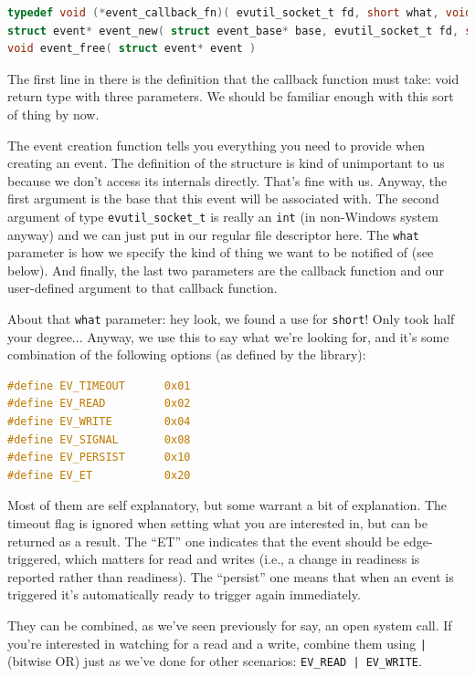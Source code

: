 \documentclass[a4paper]{report}
\begin{document}
\begin{lstlisting}[language=C]
typedef void (*event_callback_fn)( evutil_socket_t fd, short what, void* arg )
struct event* event_new( struct event_base* base, evutil_socket_t fd, short what, event_callback_fn cb, void* arg )
void event_free( struct event* event )
\end{lstlisting}

The first line in there is the definition that the callback function must take: void return type with three parameters. We should be familiar enough with this sort of thing by now.

The event creation function tells you everything you need to provide when creating an event. The definition of the structure is kind of unimportant to us because we don't access its internals directly. That's fine with us. Anyway, the first argument is the base that this event will be associated with. The second argument of type \texttt{evutil\_socket\_t} is really an \texttt{int} (in non-Windows system anyway) and we can just put in our regular file descriptor here. The \texttt{what} parameter is how we specify the kind of thing we want to be notified of (see below). And finally, the last two parameters are the callback function and our user-defined argument to that callback function.

About that \texttt{what} parameter: hey look, we found a use for \texttt{short}! Only took half your degree... Anyway, we use this to say what we're looking for, and it's some combination of the following options (as defined by the library):

\begin{lstlisting}[language=C]
#define EV_TIMEOUT      0x01
#define EV_READ         0x02
#define EV_WRITE        0x04
#define EV_SIGNAL       0x08
#define EV_PERSIST      0x10
#define EV_ET           0x20
\end{lstlisting}

Most of them are self explanatory, but some warrant a bit of explanation. The timeout flag is ignored when setting what you are interested in, but can be returned as a result. The ``ET'' one indicates that the event should be edge-triggered, which matters for read and writes (i.e., a change in readiness is reported rather than readiness). The ``persist'' one means that when an event is triggered it's automatically ready to trigger again immediately.

They can be combined, as we've seen previously for say, an open system call. If you're interested in watching for a read and a write, combine them using \texttt{|} (bitwise OR) just as we've done for other scenarios: \texttt{EV\_READ | EV\_WRITE}.
\end{document}
